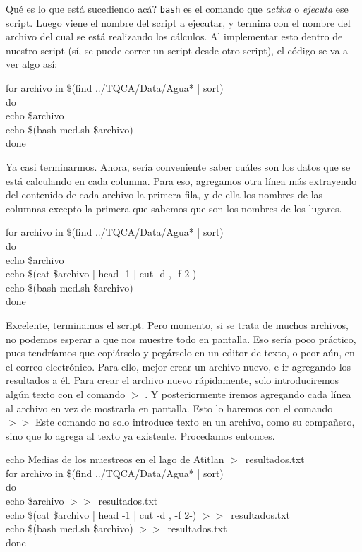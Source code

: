 \documentclass[10pt,letterpaper]{article}
\newcommand{\inlinecode}[1]{
\colorbox{light-gray}{\texttt{#1}}
}
\newenvironment{Code}
{
\begin{lrbox}{\selvestebox}%
\begin{minipage}{\dimexpr\columnwidth-2\fboxsep\relax}
\fontfamily{\ttdefault}\selectfont
}
{\end{minipage}\end{lrbox}%
\begin{center}
\colorbox{light-gray}{\usebox{\selvestebox}}
\end{center}
}
\begin{document}
Qu\'e es lo que est\'a sucediendo ac\'a? \inlinecode{bash} es el comando que \emph{activa} o \emph{ejecuta} ese script. Luego viene el nombre del script a ejecutar, y termina con el nombre del archivo del cual se est\'a realizando los c\'alculos. Al implementar esto dentro de nuestro script (s\'i, se puede correr un script desde otro script), el c\'odigo se va a ver algo as\'i:

\begin{Code}
for archivo in \$(find ../TQCA/Data/Agua* | sort)\\
do\\
echo \$archivo\\
echo \$(bash med.sh \$archivo)\\
done
\end{Code}

Ya casi terminarmos. Ahora, ser\'ia conveniente saber cu\'ales son los datos que se est\'a calculando en cada columna. Para eso, agregamos otra l\'inea m\'as extrayendo del contenido de cada archivo la primera fila, y de ella los nombres de las columnas excepto la primera que sabemos que son los nombres de los lugares.

\begin{Code}
for archivo in \$(find ../TQCA/Data/Agua* | sort)\\
do\\
echo \$archivo\\
echo \$(cat \$archivo | head -1 | cut -d , -f 2-)\\
echo \$(bash med.sh \$archivo)\\
done
\end{Code}

Excelente, terminamos el script. Pero momento, si se trata de muchos archivos, no podemos esperar a que nos muestre todo en pantalla. Eso ser\'ia poco pr\'actico, pues tendr\'iamos que copi\'arselo y peg\'arselo en un editor de texto, o peor a\'un, en el correo electr\'onico. Para ello, mejor crear un archivo nuevo, e ir agregando los resultados a \'el. Para crear el archivo nuevo r\'apidamente, solo introduciremos alg\'un texto con el comando \inlinecode{$>$}. Y posteriormente iremos agregando cada l\'inea al archivo en vez de mostrarla en pantalla. Esto lo haremos con el comando \inlinecode{$>>$} Este comando no solo introduce texto en un archivo, como su compa\~nero, sino que lo agrega al texto ya existente. Procedamos entonces.

\begin{Code}
echo Medias de los muestreos en el lago de Atitlan $>$\ resultados.txt\\
for archivo in \$(find ../TQCA/Data/Agua* | sort)\\
do\\
echo \$archivo $>>$\ resultados.txt\\
echo \$(cat \$archivo | head -1 | cut -d , -f 2-) $>>$\ resultados.txt\\
echo \$(bash med.sh \$archivo) $>>$\ resultados.txt\\
done
\end{Code}
\end{document}
